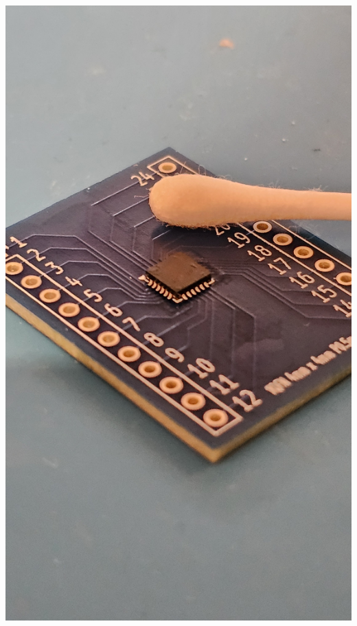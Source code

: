 \documentclass[11pt,a4paper,titlepage]{report}
\begin{document}
		\begin{center}
		\label{picture:images_mcu_soldered_2}
		\includegraphics[width=\linewidth]{assets/MCU_SOLDERED2.jpg}
	\end{center}
	
\end{document}
